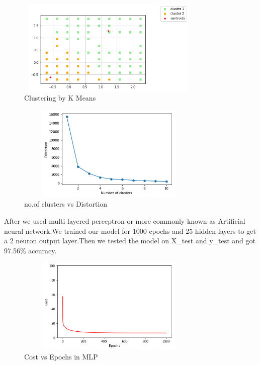 \documentclass[conference,compsoc]{IEEEtran}
\begin{document}
\begin{figure}[H]
\centering
\includegraphics[width=3.5in,height=1.8in]{km2.png}
\caption{Clustering by K Means}
\label{fig_error}

\end{figure}  
\begin{figure}[H]
\centering
\includegraphics[width=3.5in,height=1.8in]{km3.png}
\caption{no.of clusters vs Distortion}
\label{fig_error}

\end{figure}  
\par
After we used multi layered perceptron or more commonly known as Artificial neural network.We trained our model for 1000 epochs and 25 hidden layers to get a 2 neuron output layer.Then we tested the model on  X\_test and y\_test and got 97.56\% accuracy.
\begin{figure}[H]
\centering
\includegraphics[width=3.5in,height=1.8in]{mlp3.png}
\caption{Cost vs Epochs in MLP}
\label{fig_error}

\end{figure}  
\end{document}
